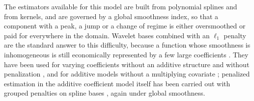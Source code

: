 \documentclass[12pt]{article} %
\theoremstyle{definition}
\theoremstyle{plain}
\begin{document}
The estimators available for this model are built from polynomial splines and
from kernels, and are governed by a global smoothness index, so that a
component with a peak, a jump or a change of regime is either oversmoothed or
paid for everywhere in the domain. Wavelet bases combined with an $\ell_1$
penalty \textcolor{colR1}{\citep{tibshirani1996regression}} are the standard answer to this difficulty, because a function whose
smoothness is inhomogeneous is still economically represented by a few large
coefficients \citep{Donoho-Johnstone-1994, Donoho-Johnstone-1998,
Antoniadis-Fan-2001}. They have been used for varying coefficients without an
additive structure and without penalization \citep*{Zhou-You-2004,
Montoril-Morettin-Chiann-2018}, and for additive models without a multiplying
covariate \citep{Sardy-Tseng-2004, Zhang-Wong-2003, Haris-Simon-Shojaie-2018,
Amato-Antoniadis-DeFeis-Gijbels-2022, Sardy-Ma-2024}; penalized estimation in
the additive coefficient model itself has been carried out with grouped
penalties on spline bases \citep{Wei-Huang-Li-2011,
Antoniadis-Gijbels-LambertLacroix-2014, Ma-Carroll-Liang-Xu-2015}, again under
global smoothness.
\end{document}
